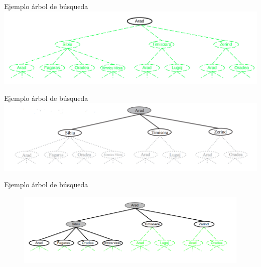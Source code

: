\documentclass{beamer}
\theoremstyle{definition}
\theoremstyle{theorem}
\theoremstyle{remark}
\begin{document}
\begin{frame}{Ejemplo árbol de búsqueda}{}
    \includegraphics[scale=0.2]{26_chap3_pag26.png}
\end{frame}

\begin{frame}{Ejemplo árbol de búsqueda}{}
\includegraphics[scale =0.3]{chap3-pag27.PNG}

\end{frame}

\begin{frame}{Ejemplo árbol de búsqueda}
\begin{figure}
    \centering
    \includegraphics[width = 112mm, scale = 1]{Chapter3Slide28.png}
\end{figure}

\end{frame}
\end{document}

